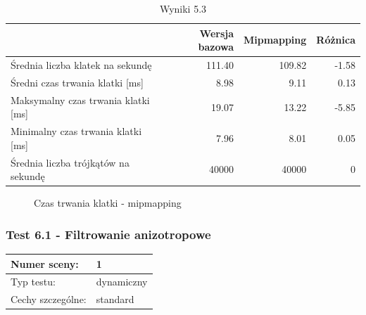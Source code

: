 \documentclass[a4paper,twoside,12pt]{book}
\begin{document}
\vbox{}

\begin{table}[H]
    \centering
    \caption{Wyniki 5.3}
    \label{tab:mip_test3}
    \begin{tabular}{|l||r|r|r|}
        \hline
        & Wersja bazowa & Mipmapping & Różnica \\
        \hline
        Średnia liczba klatek na sekundę & 111.40 & 109.82 & -1.58 \\
        \hline
        Średni czas trwania klatki [ms] & 8.98 & 9.11 & 0.13 \\
        \hline
        Maksymalny czas trwania klatki [ms] & 19.07 & 13.22 & -5.85 \\
        \hline
        Minimalny czas trwania klatki [ms] & 7.96 & 8.01 & 0.05 \\
        \hline
        Średnia liczba trójkątów na sekundę & 40000 & 40000 & 0 \\
        \hline
    \end{tabular}
\end{table}

\vbox{}

\begin{figure}[H]
\centering
{}

\caption{Czas trwania klatki - mipmapping}
\label{fig:dynamic_plot_mip3_met}
\end{figure}

\newpage

\subsubsection{Test 6.1 - Filtrowanie anizotropowe}
\begin{tabular}{|l||l|}
\hline
Numer sceny: & 1 \\
\hline
Typ testu: & dynamiczny \\
\hline
Cechy szczególne: & standard \\
\hline
\end{tabular}\\
\end{document}
